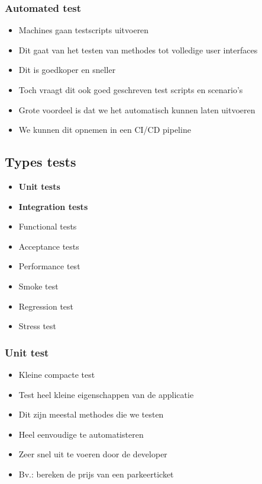 \documentclass{article}
\begin{document}
\subsubsection{Automated test}

\begin{itemize}
    \item Machines gaan testscripts uitvoeren
    \item Dit gaat van het testen van methodes tot volledige user interfaces
    \item Dit is goedkoper en sneller
    \item Toch vraagt dit ook goed geschreven test scripts en scenario’s
    \item Grote voordeel is dat we het automatisch kunnen laten uitvoeren
    \item We kunnen dit opnemen in een CI/CD pipeline
\end{itemize}

\subsection{Types tests}

\begin{itemize}
    \item \textbf{Unit tests}
    \item \textbf{Integration tests}
    \item Functional tests
    \item Acceptance tests
    \item Performance test
    \item Smoke test
    \item Regression test
    \item Stress test
\end{itemize}

\subsubsection{Unit test}

\begin{itemize}
    \item Kleine compacte test
    \item Test heel kleine eigenschappen van de applicatie
    \item Dit zijn meestal methodes die we testen
    \item Heel eenvoudige te automatisteren
    \item Zeer snel uit te voeren door de developer
    \item Bv.: bereken de prijs van een parkeerticket
\end{itemize}
\end{document}
